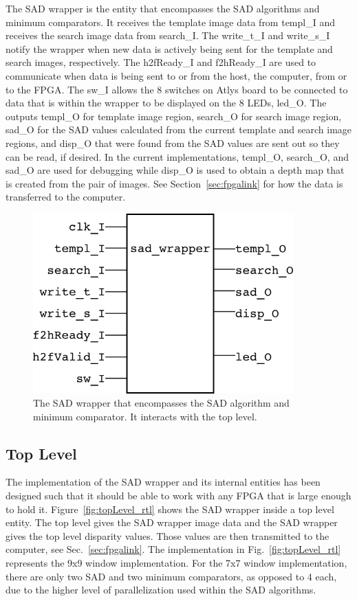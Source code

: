 The SAD wrapper is the entity that encompasses the SAD algorithms and minimum comparators. It receives the template image data from templ\_I and receives the search image data from search\_I. The write\_t\_I and write\_s\_I notify the wrapper when new data is actively being sent for the template and search images, respectively. The h2fReady\_I and f2hReady\_I are used to communicate when data is being sent to or from the host, the computer, from or to the FPGA. The sw\_I allows the 8 switches on Atlys board to be connected to data that is within the wrapper to be displayed on the 8 LEDs, led\_O. The outputs templ\_O for template image region, search\_O for search image region, sad\_O for the SAD values calculated from the current template and search image regions, and disp\_O that were found from the SAD values are sent out so they can be read, if desired. In the current implementations, templ\_O, search\_O, and sad\_O are used for debugging while disp\_O is used to obtain a depth map that is created from the pair of images. See Section~\ref{sec:fpgalink} for how the data is transferred to the computer.

\begin{figure}[h]
	\begin{center}
		\includegraphics[width=100mm]{figures/sad_wrapper_rtl.png}
		\captionfonts
		\caption{The SAD wrapper that encompasses the SAD algorithm and minimum comparator. It interacts with the top level.}
		\label{fig:sadWrapper_rtl}
	\end{center}
\end{figure}

\subsection{Top Level}

The implementation of the SAD wrapper and its internal entities has been designed such that it should be able to work with any FPGA that is large enough to hold it. Figure~\ref{fig:topLevel_rtl} shows the SAD wrapper inside a top level entity. The top level gives the SAD wrapper image data and the SAD wrapper gives the top level disparity values. Those values are then transmitted to the computer, see Sec.~\ref{sec:fpgalink}. The implementation in Fig.~\ref{fig:topLevel_rtl} represents the 9x9 window implementation. For the 7x7 window implementation, there are only two SAD and two minimum comparators, as opposed to 4 each, due to the higher level of parallelization used within the SAD algorithms.

